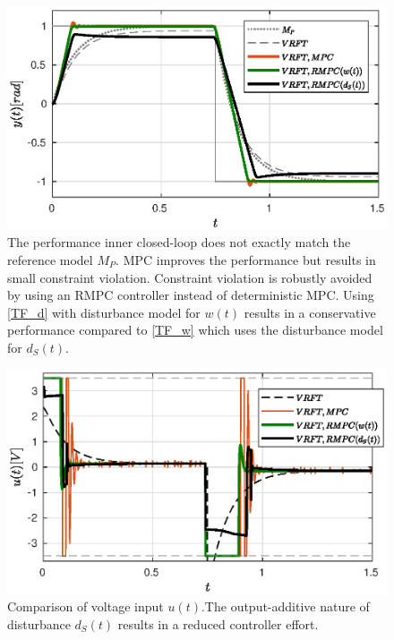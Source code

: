 \documentclass[letterpaper, 10 pt, conference]{ieeeconf}  %
\begin{document}
	\begin{figure}[t]
		\hspace{-2pt}
		\includegraphics[scale = 0.60]{VRFT_vs_MPC.eps}
		\caption{The performance inner closed-loop does not exactly match the reference model $M_P$. MPC improves the performance but results in small constraint violation. Constraint violation is robustly avoided by using an RMPC controller instead of deterministic MPC. Using \eqref{TF_d} with disturbance model for $w(t)$ results in a conservative performance compared to \eqref{TF_w} which uses the disturbance model for $d_S(t)$.  }
		\label{VRFT_y}
	\end{figure} 
	\begin{figure}[t]
		\hspace{-2pt}
		\includegraphics[scale = 0.60]{VRFT_vs_MPC_u.eps}
		\caption{Comparison of voltage input $u(t)$.The output-additive nature of disturbance $d_S(t)$ results in a reduced controller effort.}
		\label{VRFT_u}
	\end{figure} 
\end{document}
